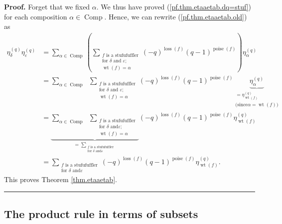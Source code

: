 \documentclass[numbers=enddot,12pt,final,onecolumn,notitlepage]{scrartcl}%
\theoremstyle{definition}
\newenvironment{proof}[1][Proof]{\noindent\textbf{#1.} }{\ \rule{0.5em}{0.5em}}
\let\sumnonlimits\sum
\renewcommand{\sum}{\sumnonlimits\limits}
\begin{document}
\begin{proof}
Forget that we fixed $\alpha$. We thus have proved
(\ref{pf.thm.etaaetab.dq=stuf}) for each composition $\alpha\in
\operatorname*{Comp}$. Hence, we can rewrite (\ref{pf.thm.etaaetab.old}) as%
\begin{align*}
\eta_{\delta}^{\left(  q\right)  }\eta_{\varepsilon}^{\left(  q\right)  }  &
=\sum_{\alpha\in\operatorname*{Comp}}\left(  \sum_{\substack{f\text{ is a
stufufuffler}\\\text{for }\delta\text{ and }\varepsilon;\\\operatorname*{wt}%
\left(  f\right)  =\alpha}}\left(  -q\right)  ^{\operatorname*{loss}\left(
f\right)  }\left(  q-1\right)  ^{\operatorname*{poise}\left(  f\right)
}\right)  \eta_{\alpha}^{\left(  q\right)  }\\
&  =\sum_{\alpha\in\operatorname*{Comp}}\ \ \sum_{\substack{f\text{ is a
stufufuffler}\\\text{for }\delta\text{ and }\varepsilon;\\\operatorname*{wt}%
\left(  f\right)  =\alpha}}\left(  -q\right)  ^{\operatorname*{loss}\left(
f\right)  }\left(  q-1\right)  ^{\operatorname*{poise}\left(  f\right)
}\underbrace{\eta_{\alpha}^{\left(  q\right)  }}_{\substack{=\eta
_{\operatorname*{wt}\left(  f\right)  }^{\left(  q\right)  }\\\text{(since
}\alpha=\operatorname*{wt}\left(  f\right)  \text{)}}}\\
&  =\underbrace{\sum_{\alpha\in\operatorname*{Comp}}\ \ \sum
_{\substack{f\text{ is a stufufuffler}\\\text{for }\delta\text{ and
}\varepsilon;\\\operatorname*{wt}\left(  f\right)  =\alpha}}}_{=\sum
_{\substack{f\text{ is a stufufuffler}\\\text{for }\delta\text{ and
}\varepsilon}}}\left(  -q\right)  ^{\operatorname*{loss}\left(  f\right)
}\left(  q-1\right)  ^{\operatorname*{poise}\left(  f\right)  }\eta
_{\operatorname*{wt}\left(  f\right)  }^{\left(  q\right)  }\\
&  =\sum_{\substack{f\text{ is a stufufuffler}\\\text{for }\delta\text{ and
}\varepsilon}}\left(  -q\right)  ^{\operatorname*{loss}\left(  f\right)
}\left(  q-1\right)  ^{\operatorname*{poise}\left(  f\right)  }\eta
_{\operatorname*{wt}\left(  f\right)  }^{\left(  q\right)  }.
\end{align*}
This proves Theorem \ref{thm.etaaetab}.
\end{proof}

\subsection{The product rule in terms of subsets}
\end{document}
